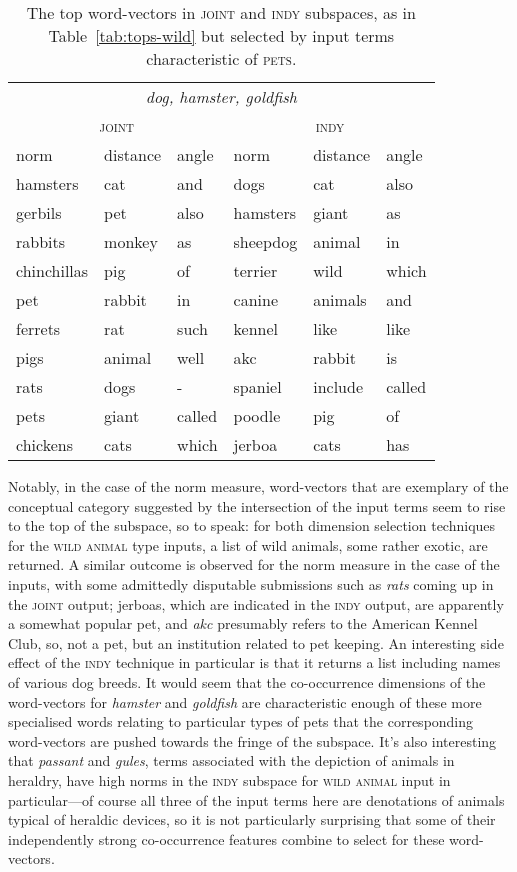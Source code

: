 \begin{table}
\centering
\begin{tabular}{lll|lll}
\hline
\multicolumn{6}{c}{\emph{dog, hamster, goldfish}} \\
\multicolumn{3}{c}{\textsc{joint}} & \multicolumn{3}{c}{\textsc{indy}} \\
\hline
norm & distance & angle & norm & distance & angle \\
\hline
hamsters & cat & and & dogs & cat & also \\
gerbils & pet & also & hamsters & giant & as \\
rabbits & monkey & as & sheepdog & animal & in \\
chinchillas & pig & of & terrier & wild & which \\
pet & rabbit & in & canine & animals & and \\
ferrets & rat & such & kennel & like & like \\
pigs & animal & well & akc & rabbit & is \\
rats & dogs & - & spaniel & include & called \\
pets & giant & called & poodle & pig & of \\
chickens & cats & which & jerboa & cats & has \\
\hline
\end{tabular}
\caption[Top Pet Word-Vectors]{The top word-vectors in \textsc{joint} and \textsc{indy} subspaces, as in Table~\ref{tab:tops-wild} but selected by input terms characteristic of \textsc{pets}.}
\label{tab:tops-pet}
\end{table}

Notably, in the case of the norm measure, word-vectors that are exemplary of the conceptual category suggested by the intersection of the input terms seem to rise to the top of the subspace, so to speak: for both dimension selection techniques for the \textsc{wild animal} type inputs, a list of wild animals, some rather exotic, are returned.  A similar outcome is observed for the norm measure in the case of the  inputs, with some admittedly disputable submissions such as \emph{rats} coming up in the \textsc{joint} output; jerboas, which are indicated in the \textsc{indy} output, are apparently a somewhat popular pet, and \emph{akc} presumably refers to the American Kennel Club, so, not a pet, but an institution related to pet keeping.  An interesting side effect of the \textsc{indy} technique in particular is that it returns a list including names of various dog breeds.  It would seem that the co-occurrence dimensions of the word-vectors for \emph{hamster} and \emph{goldfish} are characteristic enough of these more specialised words relating to particular types of pets that the corresponding word-vectors are pushed towards the fringe of the subspace.  It's also interesting that \emph{passant} and \emph{gules}, terms associated with the depiction of animals in heraldry, have high norms in the \textsc{indy} subspace for \textsc{wild animal} input in particular---of course all three of the input terms here are denotations of animals typical of heraldic devices, so it is not particularly surprising that some of their independently strong co-occurrence features combine to select for these word-vectors.

